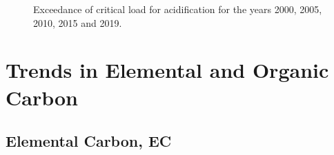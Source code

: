 \begin{figure}[ht]
 \caption{Exceedance of critical load for acidification for the years 2000, 2005, 2010, 2015 and 2019.}
\label{fig:acid}
\end{figure}






\section{Trends in Elemental and Organic Carbon}
\label{sec:trendsECOC}
\subsection{Elemental Carbon, EC}
\label{ss:trendsEC}


